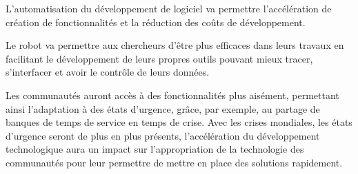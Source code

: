 L’automatisation du développement de logiciel va permettre l’accélération de création de fonctionnalités et la réduction des coûts de développement. 

Le robot va permettre aux chercheurs d’être plus efficaces dans leurs travaux en facilitant le développement de leurs propres outils pouvant mieux tracer, s’interfacer et avoir le contrôle de leurs données.

Les communautés auront accès à des fonctionnalités plus aisément, permettant ainsi l'adaptation à des états d'urgence, grâce, par exemple, au partage de banques de temps de service en temps de crise. 
Avec les crises mondiales, les états d’urgence seront de plus en plus présents, l’accélération du développement technologique aura un impact sur l’appropriation de la technologie des communautés pour leur permettre de mettre en place des solutions rapidement.